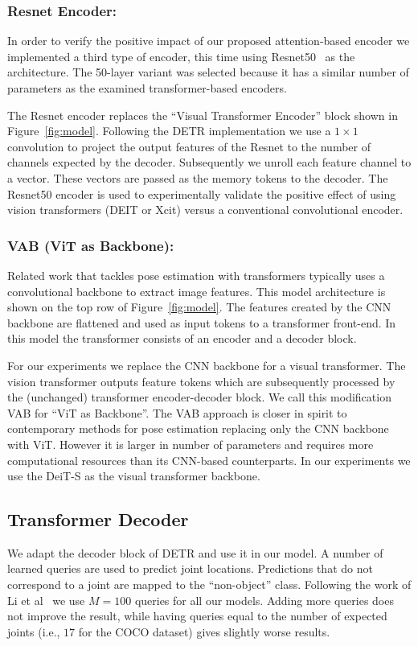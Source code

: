 \documentclass[runningheads]{llncs}
\begin{document}
\subsubsection{Resnet Encoder:}
In order to verify the positive impact of our proposed attention-based encoder
we implemented a third type of encoder, this time using Resnet50~\cite{he2016deep} 
as the architecture. The 50-layer variant was selected because it has a similar number 
of parameters as the examined transformer-based encoders.

The Resnet encoder replaces the ``Visual Transformer Encoder'' block 
shown in Figure~\ref{fig:model}. Following the DETR implementation we use a $1 \times 1$ convolution to project the output features of the Resnet to the number of channels expected by the decoder. Subsequently we unroll each feature channel to a vector. These vectors are
passed as the memory tokens to the decoder.
The Resnet50 encoder is used to experimentally validate the positive effect of 
using vision transformers (DEIT or Xcit) versus a conventional convolutional encoder. 

\subsubsection{VAB (ViT as Backbone):}
Related work that tackles pose estimation with transformers typically uses a convolutional backbone 
to extract image features. This model architecture is shown on the top row of Figure~\ref{fig:model}. The features created by the CNN backbone are flattened and used as input tokens to a transformer front-end. In this model the transformer consists of an encoder and a decoder block.

For our experiments we replace the CNN backbone for a visual transformer.
The vision transformer outputs feature tokens which are subsequently processed by the 
(unchanged) transformer encoder-decoder block. We call this modification VAB for ``ViT as Backbone''. 
The VAB approach is closer in spirit to contemporary methods for pose estimation 
replacing only the CNN backbone with ViT. However it is larger in number of parameters 
and requires more computational resources than its CNN-based counterparts.
In our experiments we use the DeiT-S as the visual transformer backbone.


\subsection{Transformer Decoder}
\label{sec:decoder}
We adapt the decoder block of DETR and use it in our model. A number of learned queries are used to predict joint locations. Predictions that do not correspond to a joint are mapped to the ``non-object'' class. Following the work of Li et al~\cite{li2021pose} we use $M=100$ queries for all our models. Adding more queries does not improve the result, while having queries equal to the number of  expected joints (i.e., $17$ for the COCO dataset) gives slightly worse results.
\end{document}
